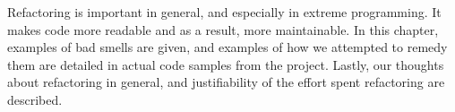 Refactoring is important in general, and especially in extreme programming. It makes code more readable and as a result, more maintainable. In this chapter, examples of bad smells are given, and examples of how we attempted to remedy them are detailed in actual code samples from the project. Lastly, our thoughts about refactoring in general, and justifiability of the effort spent refactoring are described.